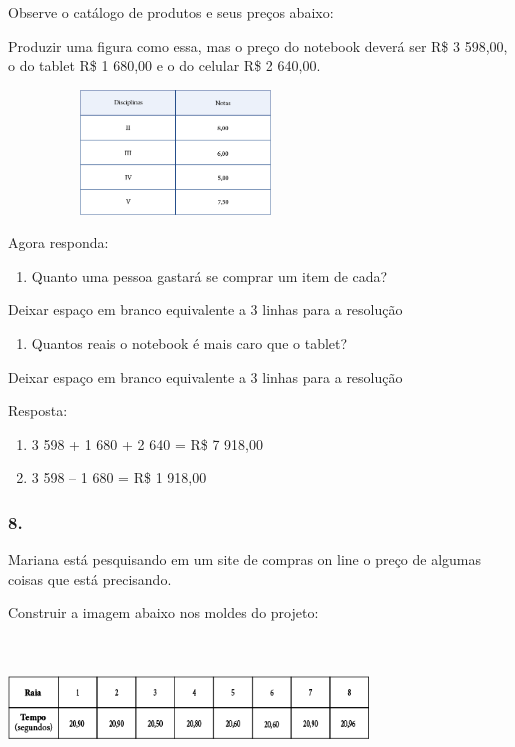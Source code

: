 Observe o catálogo de produtos e seus preços abaixo:

Produzir uma figura como essa, mas o preço do notebook deverá ser R\$ 3
598,00, o do tablet R\$ 1 680,00 e o do celular R\$ 2 640,00.

\includegraphics[width=3.48692in,height=1.30000in]{media/image85.png}

Agora responda:

\begin{enumerate}
\def\labelenumi{\alph{enumi})}
\item
  Quanto uma pessoa gastará se comprar um item de cada?
\end{enumerate}

Deixar espaço em branco equivalente a 3 linhas para a resolução

\begin{enumerate}
\def\labelenumi{\alph{enumi})}
\item
  Quantos reais o notebook é mais caro que o tablet?
\end{enumerate}

Deixar espaço em branco equivalente a 3 linhas para a resolução

Resposta:

\begin{enumerate}
\def\labelenumi{\alph{enumi})}
\item
  3 598 + 1 680 + 2 640 = R\$ 7 918,00
\item
  3 598 -- 1 680 = R\$ 1 918,00
\end{enumerate}

\subsubsection{8.}\label{section-72}

Mariana está pesquisando em um site de compras on line o preço de
algumas coisas que está precisando.

Construir a imagem abaixo nos moldes do projeto:

\includegraphics[width=3.75866in,height=1.47513in]{media/image86.png}

